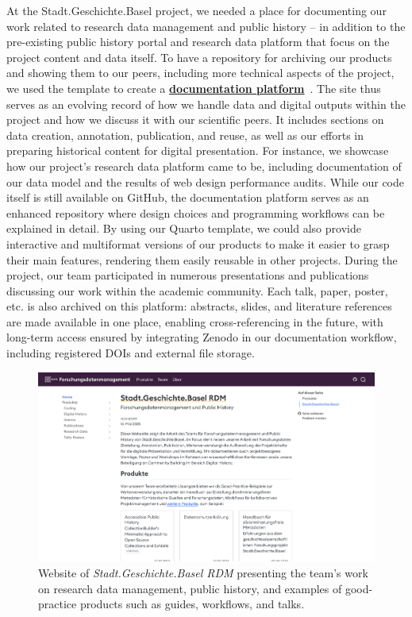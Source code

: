 \documentclass{anthology-ch}         %
\begin{document}
At the Stadt.Geschichte.Basel project, we needed a place for documenting our work related to research data management and public history -- in addition to the pre-existing public history portal and research data platform that focus on the project content and data itself. To have a repository for archiving our products and showing them to our peers, including more technical aspects of the project, we used the template to create a \href{https://dokumentation.stadtgeschichtebasel.ch}{\textbf{documentation platform}}~\cite{maehr2024g}. The site thus serves as an evolving record of how we handle data and digital outputs within the project and how we discuss it with our scientific peers. It includes sections on data creation, annotation, publication, and reuse, as well as our efforts in preparing historical content for digital presentation. For instance, we showcase how our project's research data platform came to be, including documentation of our data model and the results of web design performance audits. While our code itself is still available on GitHub, the documentation platform serves as an enhanced repository where design choices and programming workflows can be explained in detail. By using our Quarto template, we could also provide interactive and multiformat versions of our products to make it easier to grasp their main features, rendering them easily reusable in other projects. During the project, our team participated in numerous presentations and publications discussing our work within the academic community. Each talk, paper, poster, etc. is also archived on this platform: abstracts, slides, and literature references are made available in one place, enabling cross-referencing in the future, with long-term access ensured by integrating Zenodo in our documentation workflow, including registered DOIs and external file storage.

\begin{figure}[t!]
  \centering
  \includegraphics[width=0.9\linewidth]{images/dokumentation_stadtgeschichtebasel_ch.png}
  \caption{Website of \emph{Stadt.Geschichte.Basel RDM} presenting the team's work on research data management, public history, and examples of good-practice products such as guides, workflows, and talks.}
  \label{fig-sgb-rdm}
\end{figure}
\end{document}
